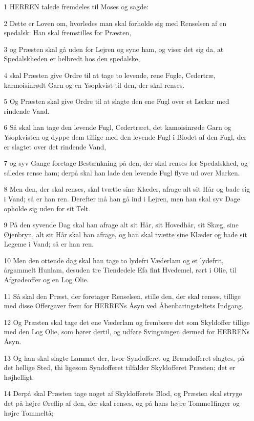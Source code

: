 \par 1 HERREN talede fremdeles til Moses og sagde:
\par 2 Dette er Loven om, hvorledes man skal forholde sig med Renselsen af en spedalsk: Han skal fremstilles for Præsten,
\par 3 og Præsten skal gå uden for Lejren og syne ham, og viser det sig da, at Spedalskheden er helbredt hos den spedalske,
\par 4 skal Præsten give Ordre til at tage to levende, rene Fugle, Cedertræ, karmoisinrødt Garn og en Ysopkvist til den, der skal renses.
\par 5 Og Præsten skal give Ordre til at slagte den ene Fugl over et Lerkar med rindende Vand.
\par 6 Så skal han tage den levende Fugl, Cedertræet, det kamoisinrøde Garn og Ysopkvisten og dyppe dem tillige med den levende Fugl i Blodet af den Fugl, der er slagtet over det rindende Vand,
\par 7 og syv Gange foretage Bestænkning på den, der skal renses for Spedalskhed, og således rense ham; derpå skal han lade den levende Fugl flyve ud over Marken.
\par 8 Men den, der skal renses, skal tvætte sine Klæder, afrage alt sit Hår og bade sig i Vand; så er han ren. Derefter må han gå ind i Lejren, men han skal syv Dage opholde sig uden for sit Telt.
\par 9 På den syvende Dag skal han afrage alt sit Hår, sit Hovedhår, sit Skæg, sine Øjenbryn, alt sit Hår skal han afrage, og han skal tvætte sine Klæder og bade sit Legeme i Vand; så er han ren.
\par 10 Men den ottende dag skal han tage to lydefri Væderlam og et lydefrit, årgammelt Hunlam, desuden tre Tiendedele Efa fint Hvedemel, rørt i Olie, til Afgrødeoffer og en Log Olie.
\par 11 Så skal den Præst, der foretager Renselsen, stille den, der skal renses, tillige med disse Offergaver frem for HERRENs Åsyn ved Åbenbaringsteltets Indgang.
\par 12 Og Præsten skal tage det ene Væderlam og frembære det som Skyldoffer tillige med den Log Olie, som hører dertil, og udføre Svingningen dermed for HERRENs Åsyn.
\par 13 Og han skal slagte Lammet der, hvor Syndofferet og Brændofferet slagtes, på det hellige Sted, thi ligesom Syndofferet tilfalder Skyldofferet Præsten; det er højhelligt.
\par 14 Derpå skal Præsten tage noget af Skyldofferets Blod, og Præsten skal stryge det på højre Øreflip af den, der skal renses, og på hans højre Tomme1finger og højre Tommeltå;
